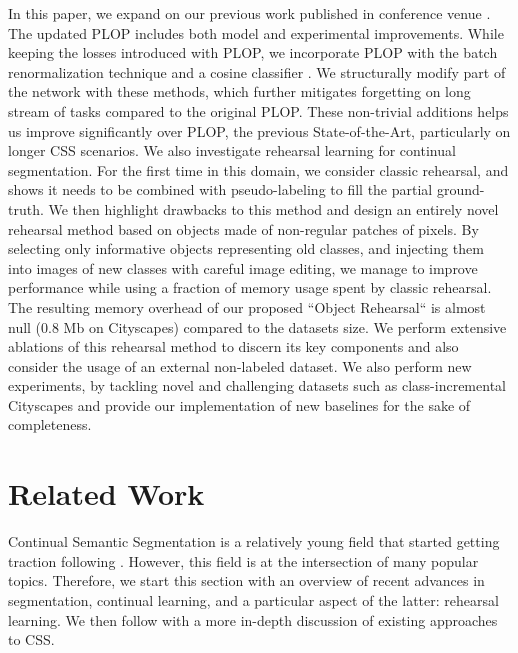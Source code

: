 In this paper, we expand on our previous work published in conference venue
\cite{douillard2020plop}. The updated PLOP includes both model and experimental improvements. While
keeping the losses introduced with PLOP, we incorporate PLOP with the batch renormalization
technique \cite{ioffe2017batchrenorm} and a cosine classifier \cite{luo2018cosine_classifier}. We
structurally modify part of the network with these methods, which further mitigates forgetting on
long stream of tasks compared to the original PLOP. These non-trivial additions helps us improve
significantly over PLOP, the previous State-of-the-Art, particularly on longer \ac{CSS} scenarios. We also
investigate rehearsal learning for continual segmentation. For the first time in this domain, we
consider classic rehearsal, and shows it needs to be combined with pseudo-labeling to fill the
partial ground-truth. We then highlight drawbacks to this method and design an entirely novel
rehearsal method based on objects made of non-regular patches of pixels. By selecting only
informative objects representing old classes, and injecting them into images of new classes with
careful image editing, we manage to improve performance while using a fraction of memory usage spent
by classic rehearsal. The resulting memory overhead of our proposed ``Object Rehearsal`` is almost
null (0.8 Mb on Cityscapes) compared to the datasets size. We perform extensive ablations of this
rehearsal method to discern its key components and also consider the usage of an external
non-labeled dataset. We also perform new experiments, by tackling novel and challenging datasets
such as class-incremental Cityscapes and provide our implementation of new baselines
\cite{yu2020continualsegmentationselftraining,cermelli2020fewshotcontinualsegm} for the sake of
completeness.

\section{Related Work}
\label{sec:seg_related}

Continual Semantic Segmentation is a relatively young field that started getting traction following
\cite{michieli2019ilt,cermelli2020modelingthebackground}. However, this field is at the intersection
of many popular topics. Therefore, we start this section with an overview of recent advances in
segmentation, continual learning, and a particular aspect of the latter: rehearsal learning. We then
follow with a more in-depth discussion of existing approaches to \ac{CSS}.

